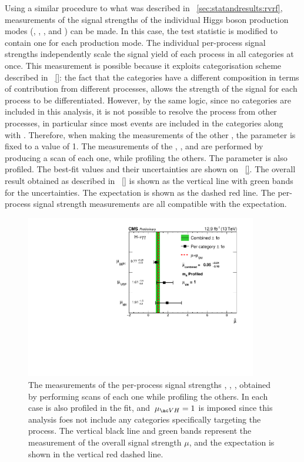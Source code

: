 Using a similar procedure to what was described in \Sec~\ref{sec:statandresults:rvrf}, measurements of the signal strengths of the individual Higgs boson production modes (\muggH, \muVBF, \muVH, and \muttH) can be made. In this case, the test statistic is modified to contain one \POI for each production mode. The individual per-process signal strengths independently scale the signal yield of each process in all categories at once. This measurement is possible because it exploits categorisation scheme described in \Sec~\ref{}: the fact that the categories have a different composition in terms of contribution from different processes, allows the strength of the signal for each process to be differentiated. However, by the same logic, since no \VHTag categories are included in this analysis, it is not possible to resolve the \VH process from other processes, in particular \ggH since most \VH events are included in the \Untagged categories along with \ggH. Therefore, when making the measurements of the other \POI\s, the parameter \muVH is fixed to a value of 1. The measurements of the \muggH, \muVH, and \muttH are performed by producing a \DNLL scan of each one, while profiling the others. The \mH parameter is also profiled. The best-fit values and their uncertainties are shown on \Fig~\ref{}. The overall result obtained as described in \Sec~\ref{} is shown as the vertical line with green bands for the uncertainties. The \SM expectation is shown as the dashed red line. The per-process signal strength measurements are all compatible with the \SM expectation.

\begin{figure}[ht!]
\centering
\includegraphics[width=0.9\textwidth]{statandresultsFigures/PerProcChannelCompatibilityProfileMH.pdf} 
\caption{The measurements of the per-process signal strengths \muggH, \muVBF, \muttH, obtained by performing \DNLL scans of each one while profiling the others. In each case \mH is also profiled in the fit, and $\muVH=1$ is imposed since this analysis foes not include any categories specifically targeting the \VH process. The vertical black line and green bands represent the measurement of the overall signal strength $\mu$, and the \SM expectation is shown in the vertical red dashed line.}

\label{fig:statandresults:mu_per_proc}

\end{figure}

